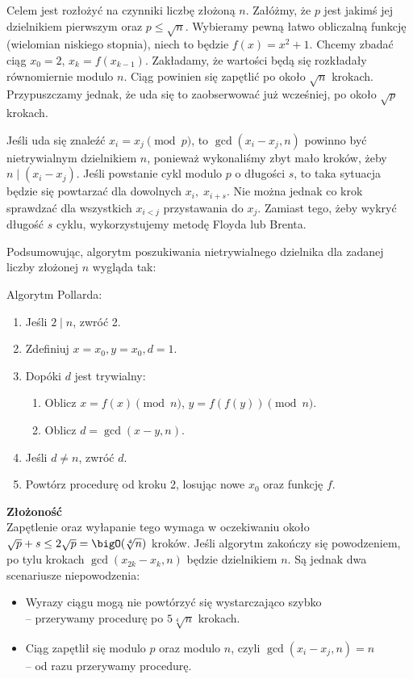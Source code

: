 Celem jest rozłożyć na czynniki liczbę złożoną \( n \). Załóżmy, że \( p \) jest jakimś jej dzielnikiem pierwszym oraz \( p \leq \sqrt{n} \).
Wybieramy pewną łatwo obliczalną funkcję (wielomian niskiego stopnia), niech to będzie \( f(x) = x^2 + 1 \). Chcemy zbadać ciąg \( x_0 = 2 \), \( x_k = f(x_{k-1}) \).
Zakładamy, że wartości będą się rozkładały równomiernie modulo \( n \). Ciąg powinien się zapętlić po około \( \sqrt{n} \) krokach. Przypuszczamy jednak, że uda się to zaobserwować już wcześniej, po około \( \sqrt{p} \) krokach.

Jeśli uda się znaleźć \( x_i = x_j \pmod{p} \), to \( \gcd(x_i - x_j, n) \) powinno być nietrywialnym dzielnikiem \( n \), ponieważ wykonaliśmy zbyt mało kroków, żeby \( n \mid (x_i - x_j) \).
Jeśli powstanie cykl modulo \( p \) o długości \( s \), to taka sytuacja będzie się powtarzać dla dowolnych \( x_i,\; x_{i+s} \). Nie można jednak co krok sprawdzać dla wszystkich \( x_{i<j} \) przystawania do \( x_j \).
Zamiast tego, żeby wykryć długość \( s \) cyklu, wykorzystujemy metodę Floyda lub Brenta.

Podsumowując, algorytm poszukiwania nietrywialnego dzielnika dla zadanej liczby złożonej \( n \) wygląda tak:
\begin{greyframe}
    Algorytm Pollarda:
    \begin{enumerate}
        \item Jeśli \( 2 \mid n \), zwróć 2.
        \item Zdefiniuj \( x = x_0, y = x_0, d = 1 \).
        \item Dopóki \( d \) jest trywialny:
        \begin{enumerate}
            \item Oblicz \( x = f(x) \pmod{n} \), \( y = f(f(y)) \pmod{n} \).
            \item Oblicz \( d = \gcd(x-y, n) \).
        \end{enumerate}
        \item Jeśli \( d \neq n \), zwróć \( d \).
        \item Powtórz procedurę od kroku 2, losując nowe \( x_0 \) oraz funkcję \( f \).
    \end{enumerate}
\end{greyframe}

\textbf{Złożoność} \\
Zapętlenie oraz wyłapanie tego wymaga w oczekiwaniu około \( \sqrt{p} + s \leq 2\sqrt{p} = \bigO(\sqrt[4]{n}) \) kroków. Jeśli algorytm zakończy się powodzeniem, po tylu krokach \( \gcd(x_{2k} - x_k, n )\) będzie dzielnikiem \( n \).
Są jednak dwa scenariusze niepowodzenia:
\begin{itemize}
    \item Wyrazy ciągu mogą nie powtórzyć się wystarczająco szybko \\
    -- przerywamy procedurę po \( 5\sqrt[4]{n} \) krokach.
    \item Ciąg zapętlił się modulo \( p \) oraz modulo \( n \), czyli \( \gcd(x_i - x_j, n) = n \) \\
    -- od razu przerywamy procedurę.
\end{itemize}

